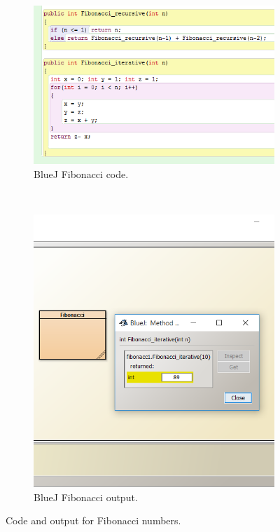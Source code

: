 \begin{figure}[!h]
  \centering
    \begin{subfigure}[b]{0.45\textwidth}
    \begin{center}
      \includegraphics[scale=0.7]{./pics/bluej_fibo_code}
      \caption{BlueJ Fibonacci code.}
      \label{fig:bluej_fibo_code}
    \end{center}
    \end{subfigure}
    ~
    \begin{subfigure}[b]{0.45\textwidth}
    \begin{center}
      \includegraphics[scale=0.6]{./pics/bluej_fibo_code2}
      \caption{BlueJ Fibonacci output.}
      \label{fig:bluej_fibo_code2}
    \end{center}
    \end{subfigure}
    \caption{Code and output for Fibonacci numbers.}
    \label{fig:bluej_fibo}
\end{figure}
